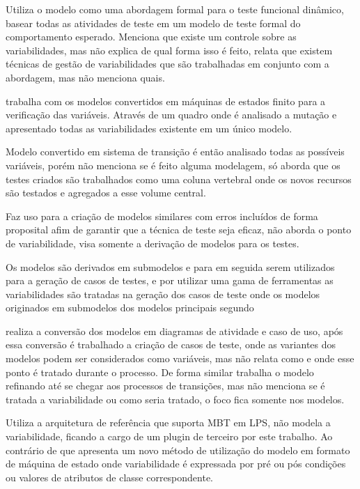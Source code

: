 \cite{lochau2012model}Utiliza o modelo como uma abordagem formal para o teste funcional dinâmico, basear todas as atividades de teste em um modelo de teste formal do comportamento esperado.
Menciona que existe um controle sobre as variabilidades, mas não explica de qual forma isso é feito, relata que existem técnicas de gestão de variabilidades que são trabalhadas em conjunto com a abordagem, mas não menciona quais.

\cite{devroey2015vibes} trabalha com os modelos convertidos em máquinas de estados finito para a verificação das variáveis. Através de um quadro onde é analisado a mutação e apresentado todas as variabilidades existente em um único modelo.

Modelo convertido em sistema de transição é então analisado todas as possíveis variáveis, porém \cite{beohar2014spinal} não menciona se é feito alguma modelagem, só aborda que os testes criados são trabalhados como uma coluna vertebral onde os novos recursos são testados e agregados a esse volume central.

Faz uso para a criação de modelos similares com erros incluídos de forma proposital afim de garantir que a técnica de teste seja eficaz, \cite{henard2013assessing} não aborda o ponto de variabilidade, visa somente a derivação de modelos para os testes.

Os modelos são derivados em submodelos e para em seguida serem utilizados para a geração de casos de testes, e por utilizar uma gama de ferramentas as variabilidades são tratadas na geração dos casos de teste onde os modelos originados em submodelos dos modelos principais segundo \cite{perrouin2010automated}

\cite{hasling2008model} realiza a conversão dos modelos em diagramas de atividade e caso de uso, após essa conversão é trabalhado a criação de casos de teste, onde as variantes dos modelos podem ser considerados como variáveis, mas não relata como e onde esse ponto é tratado durante o processo. De forma similar \cite{gebizli2016successive} trabalha o modelo refinando até se chegar aos processos de transições, mas não menciona se é tratada a variabilidade ou como seria tratado, o foco fica somente nos modelos.

\cite{rodrigues2012software}Utiliza a arquitetura de referência que suporta MBT em LPS, não modela a variabilidade, ficando a cargo de um plugin de terceiro por este trabalho. Ao contrário de \cite{weissleder2008reusing} que apresenta um novo método de utilização do modelo em formato de máquina de estado onde variabilidade é expressada por pré ou pós condições ou valores de atributos de classe correspondente.



